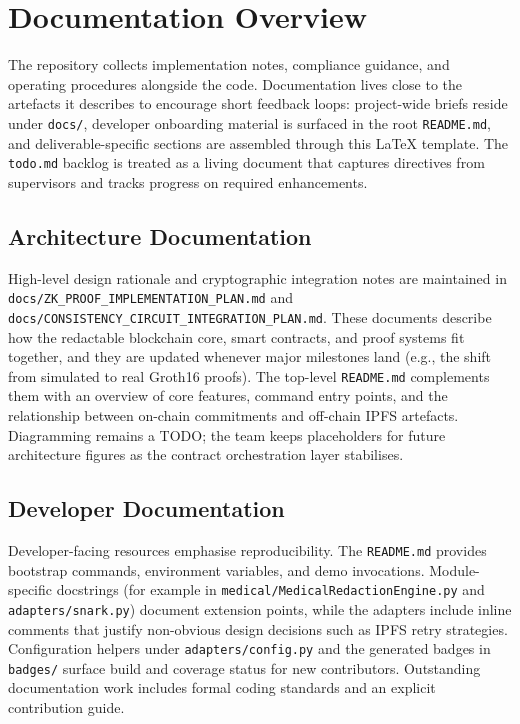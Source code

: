 \section{Documentation Overview}

The repository collects implementation notes, compliance guidance, and operating procedures alongside the code. Documentation lives close to the artefacts it describes to encourage short feedback loops: project-wide briefs reside under \texttt{docs/}, developer onboarding material is surfaced in the root \texttt{README.md}, and deliverable-specific sections are assembled through this \LaTeX{} template. The \texttt{todo.md} backlog is treated as a living document that captures directives from supervisors and tracks progress on required enhancements.

\subsection{Architecture Documentation}
High-level design rationale and cryptographic integration notes are maintained in \texttt{docs/ZK\_PROOF\_IMPLEMENTATION\_PLAN.md} and \texttt{docs/CONSISTENCY\_CIRCUIT\_INTEGRATION\_PLAN.md}. These documents describe how the redactable blockchain core, smart contracts, and proof systems fit together, and they are updated whenever major milestones land (e.g., the shift from simulated to real Groth16 proofs). The top-level \texttt{README.md} complements them with an overview of core features, command entry points, and the relationship between on-chain commitments and off-chain IPFS artefacts. Diagramming remains a TODO; the team keeps placeholders for future architecture figures as the contract orchestration layer stabilises.

\subsection{Developer Documentation}
Developer-facing resources emphasise reproducibility. The \texttt{README.md} provides bootstrap commands, environment variables, and demo invocations. Module-specific docstrings (for example in \texttt{medical/MedicalRedactionEngine.py} and \texttt{adapters/snark.py}) document extension points, while the adapters include inline comments that justify non-obvious design decisions such as IPFS retry strategies. Configuration helpers under \texttt{adapters/config.py} and the generated badges in \texttt{badges/} surface build and coverage status for new contributors. Outstanding documentation work includes formal coding standards and an explicit contribution guide.


